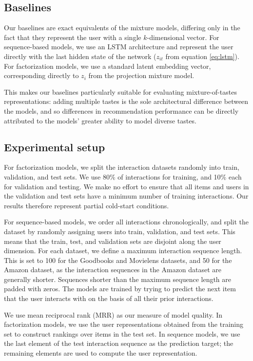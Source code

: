 \documentclass[sigconf]{acmart}
\begin{document}
\subsection{Baselines}
Our baselines are exact equivalents of the mixture models, differing only in the fact that they represent the user with a single $k$-dimensional vector. For sequence-based models, we use an LSTM architecture and represent the user directly with the last hidden state of the network ($z_{it}$ from equation \ref{eq:lstm}). For factorization models, we use a standard latent embedding vector, corresponding directly to $z_i$ from the projection mixture model.

This makes our baselines particularly suitable for evaluating mixture-of-tastes representations: adding multiple tastes is the sole architectural difference between the models, and so differences in recommendation performance can be directly attributed to the models' greater ability to model diverse tastes.

\subsection{Experimental setup}
For factorization models, we split the interaction datasets randomly into train, validation, and test sets. We use 80\% of interactions for training, and 10\% each for validation and testing. We make no effort to ensure that all items and users in the validation and test sets have a minimum number of training interactions. Our results therefore represent partial cold-start conditions.

For sequence-based models, we order all interactions chronologically, and split the dataset by randomly assigning users into train, validation, and test sets. This means that the train, test, and validation sets are disjoint along the user dimension. For each dataset, we define a maximum interaction sequence length. This is set to 100 for the Goodbooks and Movielens datasets, and 50 for the Amazon dataset, as the interaction sequences in the Amazon dataset are generally shorter. Sequences shorter than the maximum sequence length are padded with zeros. The models are trained by trying to predict the next item that the user interacts with on the basis of all their prior interactions.

We use mean reciprocal rank (MRR) as our measure of model quality. In factorization models, we use the user representations obtained from the training set to construct rankings over items in the test set. In sequence models, we use the last element of the test interaction sequence as the prediction target; the remaining elements are used to compute the user representation.
\end{document}
